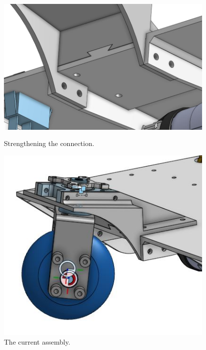\begin{figure}[ht]
\centering
\begin{minipage}[b]{.48\textwidth}
  \centering
  \includegraphics[width=0.95\textwidth]{Meetings/October/10-15-21/10-15-21_CAD_Figure3 - Nathan Forrer.JPG}
  \caption{Strengthening the connection.}
  \label{fig:pic3}
\end{minipage}%
\hfill%
\begin{minipage}[b]{.48\textwidth}
  \centering
  \includegraphics[width=0.95\textwidth]{Meetings/October/10-15-21/10-15-21_CAD_Figure4 - Nathan Forrer.JPG}
  \caption{The current assembly.}
  \label{fig:pic4}
\end{minipage}
\end{figure}


